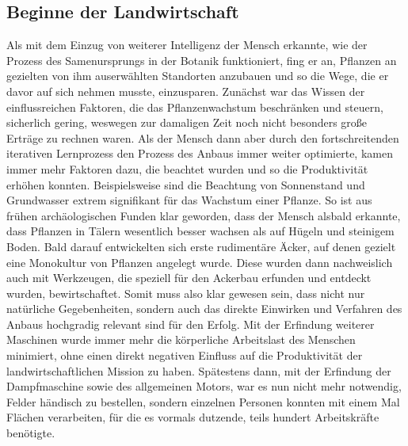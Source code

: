 \subsection{Beginne der Landwirtschaft}
Als mit dem Einzug von weiterer Intelligenz der Mensch erkannte, wie der Prozess des Samenursprungs in der Botanik funktioniert, fing er an, Pflanzen an gezielten von ihm auserwählten Standorten anzubauen und so die Wege, die er davor auf sich nehmen musste, einzusparen. Zunächst war das Wissen der einflussreichen Faktoren, die das Pflanzenwachstum beschränken und steuern, sicherlich gering, weswegen zur damaligen Zeit noch nicht besonders große Erträge zu rechnen waren. Als der Mensch dann aber durch den fortschreitenden iterativen Lernprozess den Prozess des Anbaus immer weiter optimierte, kamen immer mehr Faktoren dazu, die beachtet wurden und so die Produktivität erhöhen konnten. Beispielsweise sind die Beachtung von Sonnenstand und Grundwasser extrem signifikant für das Wachstum einer Pflanze. So ist aus frühen archäologischen Funden klar geworden, dass der Mensch alsbald erkannte, dass Pflanzen in Tälern wesentlich besser wachsen als auf Hügeln und steinigem Boden. Bald darauf entwickelten sich erste rudimentäre Äcker, auf denen gezielt eine Monokultur von Pflanzen angelegt wurde. Diese wurden dann nachweislich auch mit Werkzeugen, die speziell für den Ackerbau erfunden und entdeckt wurden, bewirtschaftet. Somit muss also klar gewesen sein, dass nicht nur natürliche Gegebenheiten, sondern auch das direkte Einwirken und Verfahren des Anbaus hochgradig relevant sind für den Erfolg. Mit der Erfindung weiterer Maschinen wurde immer mehr die körperliche Arbeitslast des Menschen minimiert, ohne einen direkt negativen Einfluss auf die Produktivität der landwirtschaftlichen Mission zu haben. Spätestens dann, mit der Erfindung der Dampfmaschine sowie des allgemeinen Motors, war es nun nicht mehr notwendig, Felder händisch zu bestellen, sondern einzelnen Personen konnten mit einem Mal Flächen verarbeiten, für die es vormals dutzende, teils hundert Arbeitskräfte benötigte.
